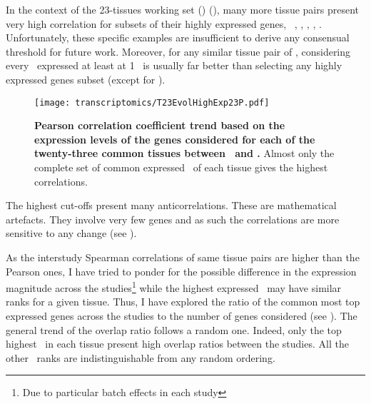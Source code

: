 In the context of the 23-tissues working set (\setTwo) (),
many more tissue pairs present very high correlation for subsets of their highly
expressed genes, \ie\ \skeletal, \Thyroid, \Cortex, \Uterus, \Kidney.
Unfortunately, these specific examples are insufficient
to derive any consensual threshold for future work.
Moreover,
for any similar tissue pair of \setTwo,
considering every \pcg\ expressed at least at 1 \FPKM\ is usually
far better than selecting any highly expressed genes subset
(except for \kidney).

\begin{figure}[!htpb]
    \texttt{[image: transcriptomics/T23EvolHighExp23P.pdf]}\centering
    \caption[Pearson correlation coefficient trend based on the expression
    levels of the genes considered for each of the 23 common tissues]{%
\label{fig:CorHighExp23T}\textbf{Pearson correlation coefficient trend based
on the expression levels of the genes considered
for each of the twenty-three common tissues between \uhlen\ and \gtex.}
Almost only the complete set of common expressed \pcgs\ of each tissue gives
the highest correlations.}
\end{figure}

The highest cut-offs present many anticorrelations.
These are mathematical artefacts.
They involve very few genes
and as such the correlations are more sensitive to any change
(see ).

As the interstudy Spearman correlations of same tissue pairs
are higher than the Pearson ones,
I have tried to ponder for the possible difference in the expression magnitude
across the studies\footnote{Due to particular batch effects in each study}
while the highest expressed \pc\ may have similar ranks
for a given tissue.
Thus, I have explored the ratio of the common most top expressed
genes across the studies to the number of genes considered
(see ).
The general trend of the overlap ratio follows a random one.
Indeed, only the top highest \pcgs\ in each tissue
present high overlap ratios between the studies.
All the other \pcg\ ranks are indistinguishable from any random ordering.

\begin{comment}
While a study of the highly expressed \pcgs\ is interesting,
its ability on explaining the underlying reasons
of the strong interstudy tissue correlations seems limited at best
or even inadequate.
\end{comment}

